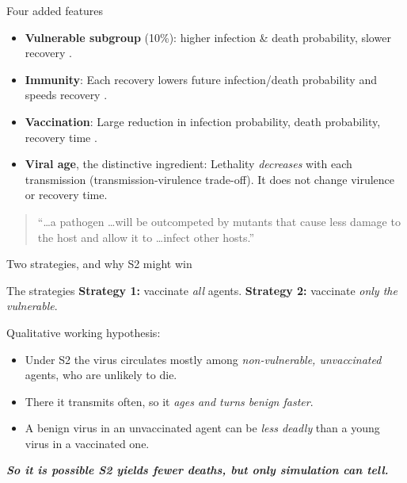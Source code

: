 \documentclass{if-beamer}
\begin{document}
\begin{frame}{Four added features}
\justifying
\begin{itemize}
  \item \textbf{Vulnerable subgroup} (10\%): higher infection \& death probability, slower recovery \autocite{Biswas2021}.
\pause
  \item \textbf{Immunity}: Each recovery lowers future infection/death probability and speeds recovery \autocite{Hall2021}.
\pause
  \item \textbf{Vaccination}: Large reduction in infection probability, death probability, recovery time \autocite{Altmann2022}.
\pause
  \item \textbf{Viral age}, the distinctive ingredient: Lethality \emph{decreases} with each transmission (transmission-virulence trade-off). It does not change virulence or recovery time.
\end{itemize}

\strut

\pause
\begin{quote}\small
``\dots a pathogen \dots will be outcompeted by mutants that cause less damage to the host and allow it to \dots infect other hosts.'' \autocite[71]{Kun2023}
\end{quote}
\end{frame}

\begin{frame}{Two strategies, and why S2 might win}
\justifying

\begin{block}{The strategies}
\textbf{Strategy 1:} vaccinate \emph{all} agents. \quad\textbf{Strategy 2:} vaccinate \emph{only the vulnerable}.
\end{block}

\strut
\pause
Qualitative working hypothesis:
\begin{itemize}
  \item Under S2 the virus circulates mostly among \emph{non-vulnerable, unvaccinated} agents, who are unlikely to die.
\pause
  \item There it transmits often, so it \emph{ages and turns benign faster}.
\pause
  \item A benign virus in an unvaccinated agent can be \emph{less deadly} than a young virus in a vaccinated one.
\end{itemize}

\strut

\pause
\textbf{\textit{So it is possible S2 yields fewer deaths, but only simulation can tell.}}
\end{frame}
\end{document}
